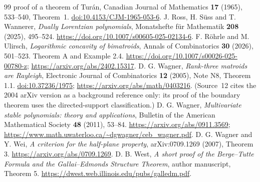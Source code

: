 \documentclass[11pt]{article}
\numberwithin{equation}{section}
\theoremstyle{definition}\newtheorem{definition}[theorem]{Definition}\newtheorem{remark}[theorem]{Remark}
\begin{document}
\begin{thebibliography}{99}
{proof of a theorem of Tur\'an}, Canadian Journal of Mathematics \textbf{17}
(1965), 533--540, Theorem~1.
\href{https://doi.org/10.4153/CJM-1965-053-6}{doi:10.4153/CJM-1965-053-6}.
 J. Ross, H. S\"uss and T. Wannerer, \emph{Dually Lorentzian
polynomials}, Monatshefte f\"ur Mathematik \textbf{208} (2025), 495--524.
\url{https://doi.org/10.1007/s00605-025-02134-6}.
 F. R\"ohrle and M. Ulirsch, \emph{Logarithmic concavity of
bimatroids}, Annals of Combinatorics \textbf{30} (2026), 501--523. Theorem A
and Example 2.4. \url{https://doi.org/10.1007/s00026-025-00780-z};
\url{https://arxiv.org/abs/2402.15317}.
 D. G. Wagner, \emph{Rank-three matroids are Rayleigh},
Electronic Journal of Combinatorics \textbf{12} (2005), Note N8, Theorem 1.1.
\href{https://doi.org/10.37236/1975}{doi:10.37236/1975};
\url{https://arxiv.org/abs/math/0403216}. (Source~12 cites the 2004 arXiv
version as a background reference only: its proof of the boundary theorem
uses the directed-support classification.)
 D. G. Wagner, \emph{Multivariate stable polynomials:
theory and applications}, Bulletin of the American Mathematical Society
\textbf{48} (2011), 53--84. \url{https://arxiv.org/abs/0911.3569};
\url{https://www.math.uwaterloo.ca/~dgwagner/ceb_wagner.pdf}.
 D. G. Wagner and Y. Wei, \emph{A criterion for the half-plane
property}, arXiv:0709.1269 (2007), Theorem 3.
\url{https://arxiv.org/abs/0709.1269}.
 D. B. West, \emph{A short proof of the Berge--Tutte Formula and
the Gallai--Edmonds Structure Theorem}, author manuscript, Theorem 5.
\url{https://dwest.web.illinois.edu/pubs/galledm.pdf}.
\end{thebibliography}
\end{document}
